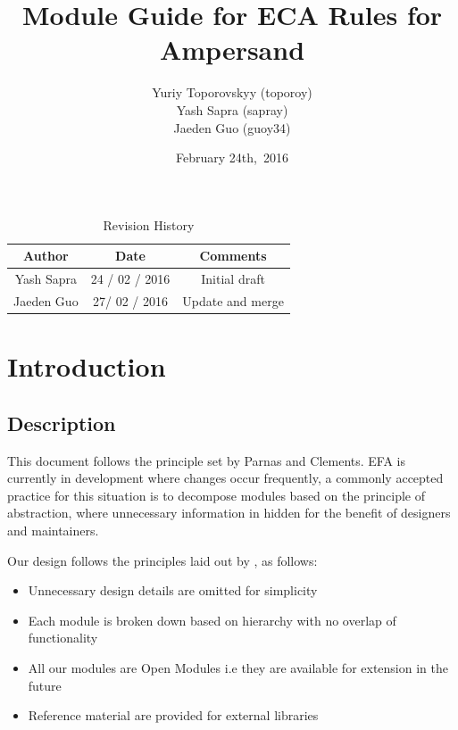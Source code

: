 \documentclass[12pt]{article}
\begin{document}
\title{\vspace*{3cm} Module Guide for ECA Rules for Ampersand} 
\author{Yuriy Toporovskyy (toporoy)\\ Yash Sapra (sapray) \\ Jaeden Guo (guoy34)}
\date{February 24th,\ 2016} 


\maketitle
\newpage
\vspace*{1cm}
\begin{table}[ht!]\begin{center}
        \caption{Revision History}  
        \begin{tabular}{|c|c|c|}\hline
            \textbf{Author} & \textbf{Date} & \textbf{Comments} \\\hline 
            Yash Sapra & 24 / 02 / 2016 & Initial draft\\\hline
	 Jaeden Guo & 27/ 02 / 2016 & Update and merge \\\hline
        \end{tabular}
    \end{center}\end{table}
\newpage

\tableofcontents

\newpage

\section{Introduction}
\subsection{Description}
This document follows the principle set by Parnas and Clements\citep{fakeIt}. 
EFA is currently in development where changes occur frequently, a 
commonly accepted practice for this situation is to decompose modules based on 
the principle of abstraction, where unnecessary information in hidden for the 
benefit of designers and maintainers\citep{modStruct,Parnas1972}.
 
Our design follows the principles laid out by \citep{modStruct}, as follows:
\begin{itemize}
\item Unnecessary design details are omitted for simplicity
\item Each module is broken down based on hierarchy with no overlap of functionality
\item All our modules are Open Modules i.e they are available for extension in the future
\item Reference material are provided for external libraries
\end{itemize}
\end{document}
